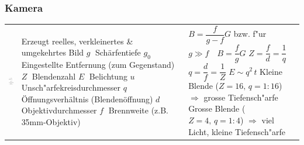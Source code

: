 \subsubsection{Kamera  }
\begin{tabular}{lll}
\parbox{3cm}{
	\includegraphics[width=3cm]{./bilder/kamera.png}}
	& \parbox{7cm}{
	Erzeugt reelles, verkleinertes \& umgekehrtes Bild \\ \\
	$g \;$ Schärfentiefe\\
	$g_0 \;$ Eingestellte Entfernung (zum Gegenstand)\\
	$Z \;$ Blendenzahl \\
	$E \;$ Belichtung \\
	$u \;$ Unsch"arfekreisdurchmesser \\
	$q \;$ Öffnungsverhältnis (Blendenöffnung) \\
	$d \;$ Objektivdurchmesser \\
	$f \;$ Brennweite (z.B. 35mm-Objektiv)
	}
	& \parbox{8cm}{
	 \\ 
	$B=\dfrac{f}{g-f}G$ \qquad bzw. f"ur $g\gg f\quad B=\dfrac{f}{g}G$\\
	$Z = \dfrac{f}{d} = \dfrac1q$ \qquad $q = \dfrac{d}{f} = \dfrac1Z$\\
	$E\sim q^2\,t$ \\
 	Kleine Blende ($Z=16, \,q=1:16$)\\ 
 		$\Rightarrow$ grosse Tiefensch"arfe\\
 	Grosse Blende ($Z=4,\,q=1:4$) \\ 
 		$\Rightarrow$ viel Licht, kleine Tiefensch"arfe} \\
\end{tabular}

